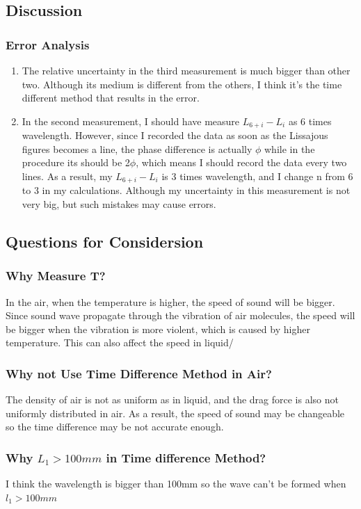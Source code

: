 \documentclass[12pt]{article}
\begin{document}
\subsection{Discussion}
\subsubsection{Error Analysis}
\begin{enumerate}
\item The relative uncertainty in the third measurement is much bigger than other two. Although its medium is different from the others, I think it's the time different method that results in the error.
\item In the second measurement, I should have measure $L_{6+i}-L_i$ as 6 times wavelength. However, since I recorded the data as soon as the Lissajous figures becomes a line, the phase difference is actually $\phi$ while in the procedure its should be 2$\phi$, which means I should record the data every two lines. As a result, my $L_{6+i}-L_i$ is 3 times wavelength, and I change n from 6 to 3 in my calculations. Although my uncertainty in this measurement is not very big, but such mistakes may cause errors.
\end{enumerate}
\subsection{Questions for Considersion}
\subsubsection{Why Measure T?}
In the air, when the temperature is higher, the speed of sound will be bigger. Since sound wave propagate through the vibration of air molecules, the speed will be bigger when the vibration is more violent, which is caused by higher temperature. This can also affect the speed in liquid/
\subsubsection{Why not Use Time Difference Method in Air?}
The density of air is not as uniform as in liquid, and the drag force is also not uniformly distributed in air. As a result, the speed of sound may be changeable so the time difference may be not accurate enough.  
\subsubsection{Why $L_1>100mm$ in Time difference Method?}
I think the wavelength is bigger than 100mm so the wave can't be formed when $l_1>100mm$
\end{document}

